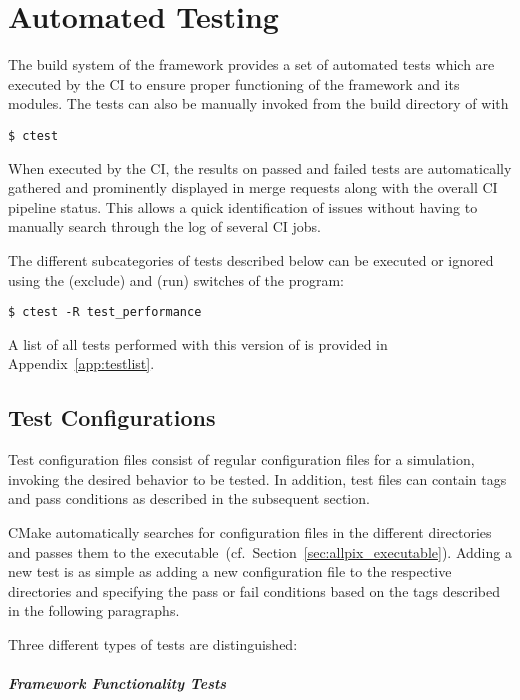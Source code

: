 \chapter{Automated Testing}
\label{ch:testing}

The build system of the framework provides a set of automated tests which are executed by the CI to ensure proper functioning of the framework and its modules.
The tests can also be manually invoked from the build directory of \apsq with
\begin{verbatim}
$ ctest
\end{verbatim}
When executed by the CI, the results on passed and failed tests are automatically gathered and prominently displayed in merge requests along with the overall CI pipeline status.
This allows a quick identification of issues without having to manually search through the log of several CI jobs.

The different subcategories of tests described below can be executed or ignored using the  (exclude) and  (run) switches of the  program:
\begin{verbatim}
$ ctest -R test_performance
\end{verbatim}

A list of all tests performed with this version of \apsq is provided in Appendix~\ref{app:testlist}.
\section{Test Configurations}

Test configuration files consist of regular \apsq configuration files for a simulation, invoking the desired behavior to be tested.
In addition, test files can contain tags and pass conditions as described in the subsequent section.

CMake automatically searches for \apsq configuration files in the different directories and passes them to the \apsq executable~(cf.\ Section~\ref{sec:allpix_executable}).
Adding a new test is as simple as adding a new configuration file to the respective directories and specifying the pass or fail conditions based on the tags described in the following paragraphs.

Three different types of tests are distinguished:

\paragraph{Framework Functionality Tests}

